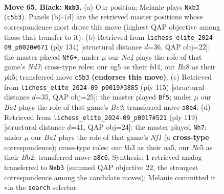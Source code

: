 \documentclass[11pt]{article}
\begin{document}
\clearpage

\begin{figure}[p]\centering
\begin{subfigure}{0.46\textwidth}\centering
\resizebox{\linewidth}{!}{%
\newchessgame
\chessboard[
  setfen={b7/P7/5k2/2n3N1/1p3P2/1P4PB/4K2P/R7 b - - 3 65},
  showmover=false,
  pgfstyle=straightmove, color=movearrow, markmove={c5-b3}
]}
\caption{}
\end{subfigure}\hfill
\begin{subfigure}{0.46\textwidth}\centering
\resizebox{\linewidth}{!}{%
\newchessgame
\chessboard[
  setfen={8/3N1p2/6pB/3kp2p/3b4/3K3P/6P1/8 w - - 0 68},
  showmover=false,
  pgfstyle=straightmove, color=movearrow, markmove={d7-f6}
]}
\caption{}
\end{subfigure}
\\[4pt]
\begin{subfigure}{0.46\textwidth}\centering
\resizebox{\linewidth}{!}{%
\newchessgame
\chessboard[
  setfen={8/8/3nbk2/P3N2p/1P3P2/3B4/7K/8 b - - 0 58},
  showmover=false,
  pgfstyle=straightmove, color=movearrow, markmove={e6-f5}
]}
\caption{}
\end{subfigure}\hfill
\begin{subfigure}{0.46\textwidth}\centering
\resizebox{\linewidth}{!}{%
\newchessgame
\chessboard[
  setfen={5n2/5K2/2N4P/NP1k2P1/5p2/5P2/1b6/8 b - - 2 60},
  showmover=false,
  pgfstyle=straightmove, color=movearrow, markmove={f8-h7}
]}
\caption{}
\end{subfigure}
\caption{\textbf{Move 65, Black: \texttt{Nxb3}.} (a) Our position; Melanie plays \texttt{Nxb3} (\texttt{c5b3}). Panels (b)--(d) are the retrieved master positions whose correspondence most drove this move (highest QAP objective among those that transfer to it). (b) Retrieved from \texttt{lichess\_elite\_2024-09\_p0020\#671} (ply 134) [structural distance $d$=36, QAP obj=22]: the master played \texttt{Nf6+}; under $\mu$ our \emph{Nc4} plays the role of that game's \emph{Nd7}; cross-type roles: our \emph{n}g5 as their \emph{b}d4, our \emph{B}a8 as their \emph{p}h5; transferred move \texttt{c5b3} \textbf{(endorses this move)}. (c) Retrieved from \texttt{lichess\_elite\_2024-09\_p0019\#3885} (ply 115) [structural distance $d$=35, QAP obj=25]: the master played \texttt{Bf5}; under $\mu$ our \emph{Ba1} plays the role of that game's \emph{Be3}; transferred move \texttt{a8e4}. (d) Retrieved from \texttt{lichess\_elite\_2024-09\_p0017\#521} (ply 119) [structural distance $d$=41, QAP obj=24]: the master played \texttt{Nh7}; under $\mu$ our \emph{Ba1} plays the role of that game's \emph{Nf1} (a \textbf{cross-type} correspondence); cross-type roles: our \emph{b}h3 as their \emph{n}a5, our \emph{N}c5 as their \emph{B}b2; transferred move \texttt{a8c6}. Synthesis: 1 retrieved analog transferred to \texttt{Nxb3} (summed QAP objective 22, the strongest correspondence among the candidate moves); Melanie committed it via the \texttt{search} selector.}
\label{fig:thought-m129}
\end{figure}
\end{document}

